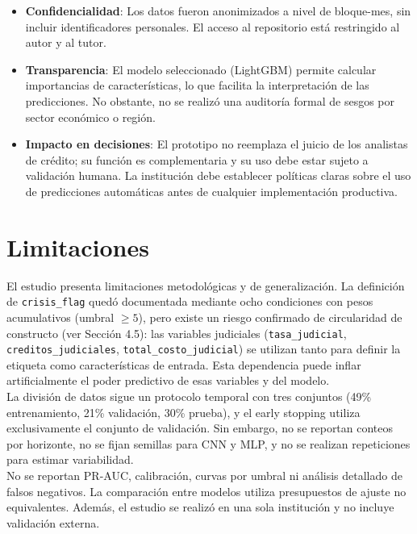 \begin{itemize}
    \item \textbf{Confidencialidad}: Los datos fueron anonimizados a nivel de bloque-mes, sin incluir identificadores personales. El acceso al repositorio está restringido al autor y al tutor.
    \item \textbf{Transparencia}: El modelo seleccionado (LightGBM) permite calcular importancias de características, lo que facilita la interpretación de las predicciones. No obstante, no se realizó una auditoría formal de sesgos por sector económico o región.
    \item \textbf{Impacto en decisiones}: El prototipo no reemplaza el juicio de los analistas de crédito; su función es complementaria y su uso debe estar sujeto a validación humana. La institución debe establecer políticas claras sobre el uso de predicciones automáticas antes de cualquier implementación productiva.
\end{itemize}

\section{Limitaciones}

El estudio presenta limitaciones metodológicas y de generalización. La definición de \texttt{crisis\_flag} quedó documentada mediante ocho condiciones con pesos acumulativos (umbral $\geq 5$), pero existe un riesgo confirmado de circularidad de constructo (ver Sección 4.5): las variables judiciales (\texttt{tasa\_judicial}, \texttt{creditos\_judiciales}, \texttt{total\_costo\_judicial}) se utilizan tanto para definir la etiqueta como características de entrada. Esta dependencia puede inflar artificialmente el poder predictivo de esas variables y del modelo.\\

La división de datos sigue un protocolo temporal con tres conjuntos (49\% entrenamiento, 21\% validación, 30\% prueba), y el early stopping utiliza exclusivamente el conjunto de validación. Sin embargo, no se reportan conteos por horizonte, no se fijan semillas para CNN y MLP, y no se realizan repeticiones para estimar variabilidad.\\

No se reportan PR-AUC, calibración, curvas por umbral ni análisis detallado de falsos negativos. La comparación entre modelos utiliza presupuestos de ajuste no equivalentes. Además, el estudio se realizó en una sola institución y no incluye validación externa.\\

